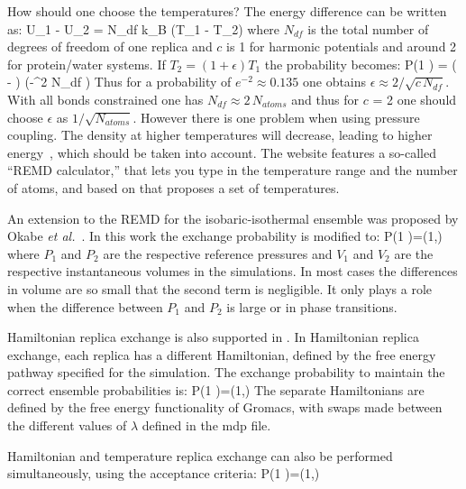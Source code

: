 \documentclass[11pt,a4paper,twoside]{article}
\begin{document}
How should one choose the temperatures?
The energy difference can be written as:
\beq
U_1 - U_2 =  N_{df}  k_B (T_1 - T_2)
\eeq
where $N_{df}$ is the total number of degrees of freedom of one replica
and $c$ is 1 for harmonic potentials and around 2 for protein/water systems.
If $T_2 = (1+\epsilon) T_1$ the probability becomes:
\beq
P(1 )
  = \exp\left( - \right)
\approx \exp\left(-\epsilon^2  N_{df} \right)
\eeq
Thus for a probability of $e^{-2}\approx 0.135$
one obtains $\epsilon \approx 2/\sqrt{c\,N_{df}}$.
With all bonds constrained one has $N_{df} \approx 2\, N_{atoms}$
and thus for $c$ = 2 one should choose $\epsilon$ as $1/\sqrt{N_{atoms}}$.
However there is one problem when using pressure coupling. The density at
higher temperatures will decrease, leading to higher energy~\cite{Seibert2005a},
which should be taken into account. The {\gromacs} website features a
so-called ``REMD calculator,'' that lets you type in the temperature range and
the number of atoms, and based on that proposes a set of temperatures.

An extension to the REMD for the isobaric-isothermal ensemble was
proposed by Okabe {\em et al.}~\cite{Okabe2001a}. In this work the
exchange probability is modified to:
\beq
P(1 )=\min\left(1,\exp{} \right)
\eeq
where $P_1$ and $P_2$ are the respective reference pressures and $V_1$ and
$V_2$ are the respective instantaneous volumes in the simulations.
In most cases the differences in volume are so small that the second
term is negligible. It only plays a role when the difference between
$P_1$ and $P_2$ is large or in phase transitions.

Hamiltonian replica exchange is also supported in {\gromacs}.  In
Hamiltonian replica exchange, each replica has a different
Hamiltonian, defined by the free energy pathway specified for the simulation.  The
exchange probability to maintain the correct ensemble probabilities is:
\beq P(1 )=\min\left(1,\exp{}
\right)
\eeq
The separate Hamiltonians are defined by the free energy functionality
of Gromacs, with swaps made between the different values of
$\lambda$ defined in the mdp file.

Hamiltonian and temperature replica exchange can also be performed
simultaneously, using the acceptance criteria:
\beq
P(1 )=\min\left(1,\exp{} \right)
\eeq
\end{document}
